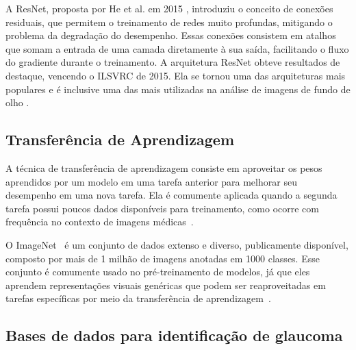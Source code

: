 \documentclass[12pt]{article}
\begin{document}
A ResNet, proposta por He et al. em 2015 \cite{he2016deep}, introduziu o conceito de conexões residuais, que permitem o treinamento de redes muito profundas, mitigando o problema da degradação do desempenho. Essas conexões consistem em atalhos que somam a entrada de uma camada diretamente à sua saída, facilitando o fluxo do gradiente durante o treinamento. A arquitetura ResNet obteve resultados de destaque, vencendo o ILSVRC de 2015. Ela se tornou uma das arquiteturas mais populares e é inclusive uma das mais utilizadas na análise de imagens de fundo de olho \cite{li_review_2021}.

%

\subsection{Transferência de Aprendizagem}
\label{sec:transfer_learning}

A técnica de transferência de aprendizagem consiste em aproveitar os pesos aprendidos por um modelo em uma tarefa anterior para melhorar seu desempenho em uma nova tarefa. Ela é comumente aplicada quando a segunda tarefa possui poucos dados disponíveis para treinamento, como ocorre com frequência no contexto de imagens médicas~\cite{matsoukas2022}.

O ImageNet~\cite{imagenet} é um conjunto de dados extenso e diverso, publicamente disponível, composto por mais de 1 milhão de imagens anotadas em 1000 classes. Esse conjunto é comumente usado no pré-treinamento de modelos, já que eles aprendem representações visuais genéricas que podem ser reaproveitadas em tarefas específicas por meio da transferência de aprendizagem~\cite{matsoukas2022}.

\subsection{Bases de dados para identificação de glaucoma}
\label{sec:review:datasets}
\end{document}
